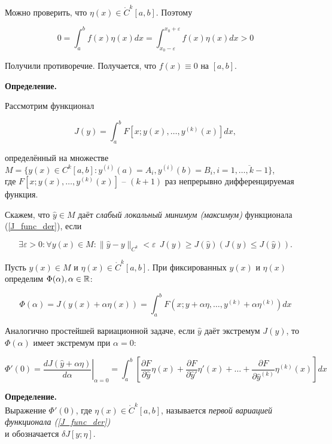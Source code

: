 Можно проверить, что $\eta(x) \in \mathring{C}^k [a, b]$.
Поэтому 

\begin{equation*}
0 = \int_a^b f(x) \eta(x) dx =
\int_{x_0 - \varepsilon}^{x_0 + \varepsilon} f(x) \eta(x) dx > 0
\end{equation*}

Получили противоречие. Получается, что $f(x) \equiv 0$ на $[a, b]$.

\textbf{Определение.}

Рассмотрим функционал

\begin{equation}\label{J_func_der}
J(y) = \int_a^b F \left[ x; y(x), \dots, y^{(k)}(x) \right] dx,
\end{equation}

определённый на множестве
$M = \{ y(x) \in C^k [a, b] : y^{(i)}(a) = A_i, y^{(i)}(b) = B_i, 
i = \overline{1, \dots, k - 1} \}$,\\
где $F \left[ x; y(x), \dots, y^{(k)}(x) \right]$ -- $(k + 1)$ раз
непрерывно дифференцируемая функция.

Скажем, что $\widehat{y} \in M$ даёт 
\textit{слабый локальный минимум (максимум)} 
функционала (\ref{J_func_der}), если

$$
\exists \varepsilon > 0 : \forall y(x) \in M : 
\| \widehat{y} - y\|_{C^k} < \varepsilon \ \ 
J(y) \geqslant J(\widehat{y}) \left( J(y) \leqslant J(\widehat{y}) \right).
$$

Пусть $y(x) \in M$ и $\eta(x) \in \mathring{C}^k [a, b]$.
При фиксированных $y(x)$ и $\eta(x)$ определим $\Phi(\alpha), \alpha \in \mathbb{R}$:

$$
\Phi(\alpha) = J( y(x) + \alpha \eta(x) ) = 
\int_a^b F \left( x; y + \alpha \eta, \dots, 
y^{(k)} + \alpha \eta^{(k)} \right) dx
$$

Аналогично простейшей вариационной задаче,
если $\widehat{y}$ даёт экстремум $J(y)$, 
то $\Phi(\alpha)$ имеет экстремум при $\alpha = 0$:

$$
\Phi'(0) = \left. \frac{dJ(\widehat{y} + \alpha \eta)}{d\alpha} 
\right|_{\alpha = 0} = 
\int_a^b \left[ 
\frac{\partial F}{\partial \widehat{y}} \eta(x) + 
\frac{\partial F}{\partial \widehat{y}'} \eta'(x) + \dots + 
\frac{\partial F}{\partial \widehat{y}^{(k)}} \eta^{(k)}(x)
\right] dx
$$

\textbf{Определение.}
\\
Выражение $\Phi'(0)$, где $\eta(x) \in \mathring{C}^k [a, b]$, называется
\textit{первой вариацией функционала (\ref{J_func_der})} \\
и обозначается $\delta J[y; \eta]$.

